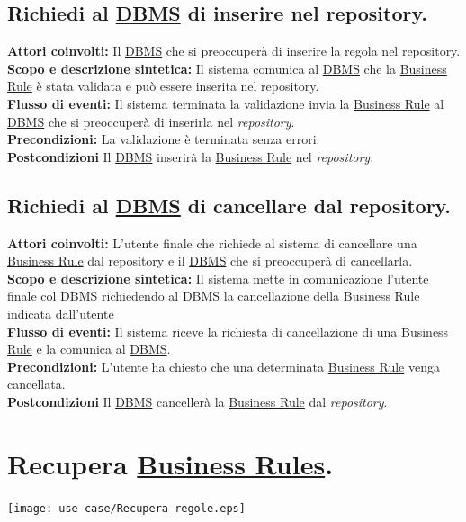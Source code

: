 \subsection{Richiedi al \underline{DBMS} di inserire nel repository.}
\textbf{Attori coinvolti:} Il \underline{DBMS} che si preoccuper\`a di inserire la regola nel repository.\\
\textbf{Scopo e descrizione sintetica:} Il sistema comunica al \underline{DBMS} che la \underline{Business Rule} \`e stata validata e pu\`o essere inserita nel repository.\\
\textbf{Flusso di eventi:} Il sistema  terminata la validazione invia la \underline{Business Rule} al \underline{DBMS} che si preoccuper\`a di inserirla nel \textit{repository}.\\
\textbf{Precondizioni:} La validazione \`e terminata senza errori.\\
\textbf{Postcondizioni} Il \underline{DBMS} inserir\`a la \underline{Business Rule} nel \textit{repository}.

\subsection{Richiedi al \underline{DBMS} di cancellare dal repository.}
\textbf{Attori coinvolti:} L'utente finale che richiede al sistema di cancellare una \underline{Business Rule} dal repository e il \underline{DBMS} che si preoccuper\`a di cancellarla.\\
\textbf{Scopo e descrizione sintetica:} Il sistema mette in comunicazione l'utente finale col \underline{DBMS} richiedendo al \underline{DBMS} la cancellazione della \underline{Business Rule} indicata dall'utente\\
\textbf{Flusso di eventi:} Il sistema riceve la richiesta di cancellazione di una \underline{Business Rule} e la comunica al \underline{DBMS}.\\
\textbf{Precondizioni:} L'utente ha chiesto che una determinata \underline{Business Rule} venga cancellata.\\
\textbf{Postcondizioni} Il \underline{DBMS} canceller\`a la \underline{Business Rule} dal \textit{repository}.


\section{Recupera \underline{Business Rules}.}
\begin{center}
 \texttt{[image: use-case/Recupera-regole.eps]}\
\end{center}


